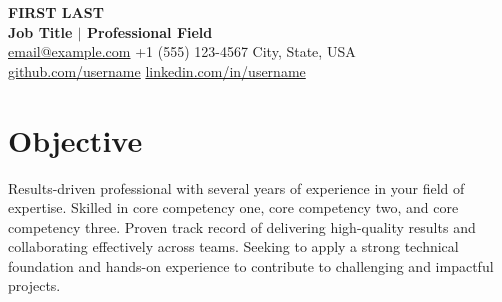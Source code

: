 \documentclass[10pt, letterpaper]{article}
\begin{document}
\begin{center}
    {\fontsize{28}{34}\bfseries FIRST LAST} \\[4pt]
    {\large\bfseries Job Title $|$ Professional Field} \\[6pt]
    \small
    \faEnvelope\enspace \href{mailto:email@example.com}{email@example.com} \quad
    \faPhone\enspace +1 (555) 123-4567 \quad
    \faMapMarker*\enspace City, State, USA \\[2pt]
    \faGithub\enspace \href{https://github.com/username}{github.com/username} \quad
    \faLinkedin\enspace \href{https://www.linkedin.com/in/username/}{linkedin.com/in/username}
\end{center}

\vspace{4pt}

\section{Objective}

Results-driven professional with several years of experience in your field of expertise. Skilled in core competency one, core competency two, and core competency three. Proven track record of delivering high-quality results and collaborating effectively across teams. Seeking to apply a strong technical foundation and hands-on experience to contribute to challenging and impactful projects.

\vspace{6pt}
\end{document}
